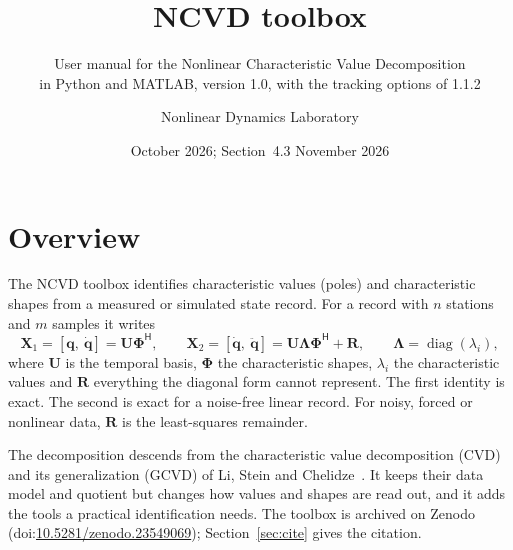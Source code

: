 \documentclass[report]{nld}
\title{NCVD toolbox}
\subtitle{User manual for the Nonlinear Characteristic Value Decomposition\\ in Python and MATLAB, version 1.0, with the tracking options of 1.1.2}
\author{Nonlinear Dynamics Laboratory}
\date{October 2026; Section~4.3 November 2026}
\theoremstyle{remark}\newtheorem*{remark}{Remark}
\newcommand{\X}{\mathbf{X}}
\newcommand{\U}{\mathbf{U}}
\newcommand{\R}{\mathbf{R}}
\newcommand{\Lam}{\symbf{\Lambda}}
\newcommand{\Ph}{\symbf{\Phi}}
\renewcommand{\H}{\mathsf{H}}
\begin{document}
\maketitle
\setcounter{tocdepth}{2}
{\small\tableofcontents}
\newpage

\section{Overview}

The NCVD toolbox identifies characteristic values (poles) and characteristic
shapes from a measured or simulated state record. For a record with $n$
stations and $m$ samples it writes
\begin{equation}
  \X_1=[\mathbf{q},\ \dot{\mathbf{q}}]=\U\Ph^\H,\qquad
  \X_2=[\dot{\mathbf{q}},\ \ddot{\mathbf{q}}]=\U\Lam\Ph^\H+\R,\qquad \Lam=\operatorname{diag}(\lambda_i),
  \label{eq:ncvd}
\end{equation}
where $\U$ is the temporal basis, $\Ph$ the characteristic shapes, $\lambda_i$
the characteristic values and $\R$ everything the diagonal form cannot
represent. The first identity is exact. The second is exact for a noise-free
linear record. For noisy, forced or nonlinear data, $\R$ is the least-squares
remainder.

The decomposition descends from the characteristic value decomposition (CVD)
and its generalization (GCVD) of Li, Stein and Chelidze~\cite{li2025}. It
keeps their data model and quotient but changes how values and shapes are
read out, and it adds the tools a practical identification needs.
The toolbox is archived on Zenodo~\cite{ncvd2026}
(doi:\href{https://doi.org/10.5281/zenodo.23549069}{10.5281/zenodo.23549069});
Section~\ref{sec:cite} gives the citation.
\end{document}
